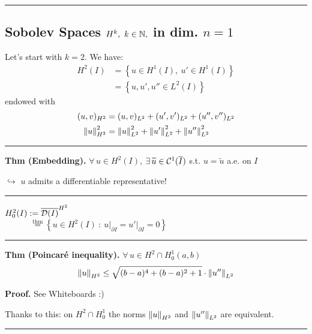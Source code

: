 \rule{0.31\textwidth}{0.2pt}


\subsection{\color{red}Sobolev Spaces \texorpdfstring{$H^k,\ k\in\mathbb{N},$}{C} in dim. \texorpdfstring{$n=1$}{C}}


Let's start with $k=2$. We have:
\begin{align*}
H^2(I)&=\left\{ u\in H^1(I),\ u'\in H^1(I) \right\}\\&=\left\{ u,u',u''\in L^2(I) \right\}
\end{align*}
endowed with
\begin{align*}
(u,v)_{H^2}&=(u,v)_{L^2}+(u',v')_{L^2}+(u'',v'')_{L^2} \\
\left\lVert u \right\rVert^2_{H^2}&=\left\lVert u \right\rVert_{L^2}^2+\left\lVert u' \right\rVert_{L^2}^2+\left\lVert u'' \right\rVert_{L^2}^2
\end{align*}

\rule{0.31\textwidth}{0.2pt}
\smallskip

\textbf{Thm (Embedding).} $\forall\,u\in H^2(I)$, $\exists\,\widetilde{u}\in\mathcal{C}^1(\overline{I})$ s.t. $u=\widetilde{u}$ a.e. on $I$

\smallskip

$\hookrightarrow$ $u$ admits a differentiable representative!

\rule{0.31\textwidth}{0.2pt}

\newcolumn 

$
H^2_0(I):=\overline{\mathcal{D}(I)}^{H^2}
$ \\
$\qquad\quad\overset{\text{thm}}{=}\left\{ u\in H^2(I)\ :\ u\big|_{\partial I}=u'\big|_{\partial I}=0 \right\}
$

\rule{0.31\textwidth}{0.2pt}
\smallskip

\textbf{Thm (Poincaré inequality).} $\forall\, u\in H^2\cap H^1_0(a,b)$
\begin{equation*}
\left\lVert u \right\rVert_{H^2}\leq \sqrt{(b-a)^4+(b-a)^2+1}\cdot \left\lVert u'' \right\rVert_{L^2}
\end{equation*}

\textbf{Proof.} See Whiteboards :)

\smallskip

Thanks to this: on $H^2\cap H^1_0$ the norms $\left\lVert u \right\rVert_{H^2}$ and $\left\lVert u'' \right\rVert_{L^2}$ are equivalent.

\rule{0.31\textwidth}{0.2pt}
\smallskip

